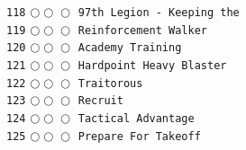 \documentclass[a4paper,landscape]{article}
\begin{document}
\begin{multicols*}{5}
\texttt{118} \(\bigcirc\!\bigcirc\!\bigcirc\)  \texttt{97th Legion - Keeping the} \vspace{-0.3mm}\\ 
\texttt{119} \(\bigcirc\!\bigcirc\!\bigcirc\)  \texttt{Reinforcement Walker} \vspace{-0.3mm}\\ 
\texttt{120} \(\bigcirc\!\bigcirc\!\bigcirc\)  \texttt{Academy Training} \vspace{-0.3mm}\\ 
\texttt{121} \(\bigcirc\!\bigcirc\!\bigcirc\)  \texttt{Hardpoint Heavy Blaster} \vspace{-0.3mm}\\ 
\texttt{122} \(\bigcirc\!\bigcirc\!\bigcirc\)  \texttt{Traitorous} \vspace{-0.3mm}\\ 
\texttt{123} \(\bigcirc\!\bigcirc\!\bigcirc\)  \texttt{Recruit} \vspace{-0.3mm}\\ 
\texttt{124} \(\bigcirc\!\bigcirc\!\bigcirc\)  \texttt{Tactical Advantage} \vspace{-0.3mm}\\ 
\texttt{125} \(\bigcirc\!\bigcirc\!\bigcirc\)  \texttt{Prepare For Takeoff} \vspace{-0.3mm}\\ 

\end{multicols*}
\end{document}
